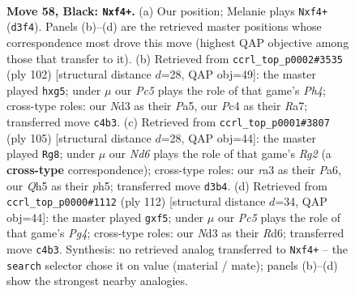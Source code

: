 \documentclass[11pt]{article}
\begin{document}
\clearpage

\begin{figure}[p]\centering
\begin{subfigure}{0.46\textwidth}\centering
\resizebox{\linewidth}{!}{%
\newchessgame
\chessboard[
  setfen={8/p5k1/1p6/7q/P1p2P2/RP1n4/6K1/8 b - - 0 58},
  showmover=false,
  pgfstyle=straightmove, color=movearrow, markmove={d3-f4}
]}
\caption{}
\end{subfigure}\hfill
\begin{subfigure}{0.46\textwidth}\centering
\resizebox{\linewidth}{!}{%
\newchessgame
\chessboard[
  setfen={6k1/R7/p7/Pp4pp/1P5P/6r1/2K5/8 w - - 0 52},
  showmover=false,
  pgfstyle=straightmove, color=movearrow, markmove={h4-g5}
]}
\caption{}
\end{subfigure}
\\[4pt]
\begin{subfigure}{0.46\textwidth}\centering
\resizebox{\linewidth}{!}{%
\newchessgame
\chessboard[
  setfen={8/6r1/p3k3/1pp4P/P4RP1/8/3K4/8 b - - 2 53},
  showmover=false,
  pgfstyle=straightmove, color=movearrow, markmove={g7-g8}
]}
\caption{}
\end{subfigure}\hfill
\begin{subfigure}{0.46\textwidth}\centering
\resizebox{\linewidth}{!}{%
\newchessgame
\chessboard[
  setfen={8/7k/3R3p/1r3p2/1p4P1/1P3PK1/8/8 w - - 2 57},
  showmover=false,
  pgfstyle=straightmove, color=movearrow, markmove={g4-f5}
]}
\caption{}
\end{subfigure}
\caption{\textbf{Move 58, Black: \texttt{Nxf4+}.} (a) Our position; Melanie plays \texttt{Nxf4+} (\texttt{d3f4}). Panels (b)--(d) are the retrieved master positions whose correspondence most drove this move (highest QAP objective among those that transfer to it). (b) Retrieved from \texttt{ccrl\_top\_p0002\#3535} (ply 102) [structural distance $d$=28, QAP obj=49]: the master played \texttt{hxg5}; under $\mu$ our \emph{Pc5} plays the role of that game's \emph{Ph4}; cross-type roles: our \emph{N}d3 as their \emph{P}a5, our \emph{P}c4 as their \emph{R}a7; transferred move \texttt{c4b3}. (c) Retrieved from \texttt{ccrl\_top\_p0001\#3807} (ply 105) [structural distance $d$=28, QAP obj=44]: the master played \texttt{Rg8}; under $\mu$ our \emph{Nd6} plays the role of that game's \emph{Rg2} (a \textbf{cross-type} correspondence); cross-type roles: our \emph{r}a3 as their \emph{P}a6, our \emph{Q}h5 as their \emph{p}h5; transferred move \texttt{d3b4}. (d) Retrieved from \texttt{ccrl\_top\_p0000\#1112} (ply 112) [structural distance $d$=34, QAP obj=44]: the master played \texttt{gxf5}; under $\mu$ our \emph{Pc5} plays the role of that game's \emph{Pg4}; cross-type roles: our \emph{N}d3 as their \emph{R}d6; transferred move \texttt{c4b3}. Synthesis: no retrieved analog transferred to \texttt{Nxf4+} -- the \texttt{search} selector chose it on value (material / mate); panels (b)--(d) show the strongest nearby analogies.}
\label{fig:thought-m115}
\end{figure}
\end{document}
